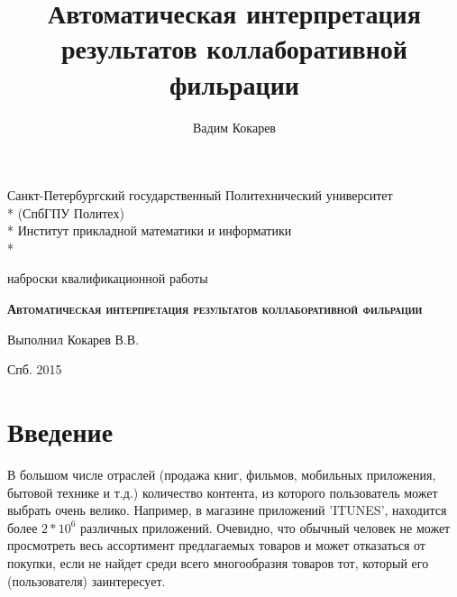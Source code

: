\documentclass[12pt,a4paper]{report}
\author{Вадим Кокарев}
\title{Автоматическая интерпретация результатов коллаборативной фильрации}
\begin{document}
\begin{titlepage}
\newpage
\begin{center}
\vspace{1cm}
Санкт-Петербургский государственный Политехнический университет  \\*
(СпбГПУ Политех) \\*
Институт прикладной математики и информатики \\*
\hrulefill
\end{center}
 

\vspace{8em}

\begin{center}
\Large наброски квалификационной работы
\end{center}

\vspace{2.5em}
 
\begin{center}
\textsc{\textbf{Автоматическая интерпретация результатов коллаборативной фильрации}}
\end{center}

\vspace{6em}
 
\begin{flushleft}
Выполнил \hrulefill Кокарев В.В. \\
\vspace{1.5em}
\end{flushleft}
 
\vspace{\fill}

\begin{center}
Спб. 2015
\end{center}

\end{titlepage}
\tableofcontents %
\pagebreak
\section{Введение}
В большом числе отраслей (продажа книг, фильмов, мобильных приложения, бытовой технике и т.д.) количество контента, из которого пользователь может выбрать очень велико. Например, в магазине приложений 'ITUNES', находится более $2*10^6$ различных приложений. Очевидно, что обычный человек не может просмотреть весь ассортимент предлагаемых товаров и может отказаться от покупки, если не найдет среди всего многообразия товаров тот, который его (пользователя) заинтересует.
\end{document}
